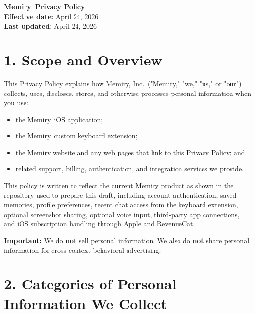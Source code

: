\documentclass[11pt]{article}
\newcommand{\AppName}{Memiry}
\newcommand{\PolicyDate}{April 24, 2026}
\newcommand{\CompanyName}{Memiry, Inc.}
\begin{document}
{\LARGE \textbf{\AppName\ Privacy Policy}}\\
\textbf{Effective date:} \PolicyDate\\
\textbf{Last updated:} \PolicyDate

\vspace{0.75em}

\section*{1. Scope and Overview}

This Privacy Policy explains how \CompanyName\ ("Memiry," "we," "us," or "our") collects, uses, discloses, stores, and otherwise processes personal information when you use:

\begin{itemize}
  \item the \AppName\ iOS application;
  \item the \AppName\ custom keyboard extension;
  \item the Memiry website and any web pages that link to this Privacy Policy; and
  \item related support, billing, authentication, and integration services we provide.
\end{itemize}

This policy is written to reflect the current Memiry product as shown in the repository used to prepare this draft, including account authentication, saved memories, profile preferences, recent chat access from the keyboard extension, optional screenshot sharing, optional voice input, third-party app connections, and iOS subscription handling through Apple and RevenueCat.

\textbf{Important:} We do \textbf{not} sell personal information. We also do \textbf{not} share personal information for cross-context behavioral advertising.

\section*{2. Categories of Personal Information We Collect}
\end{document}
